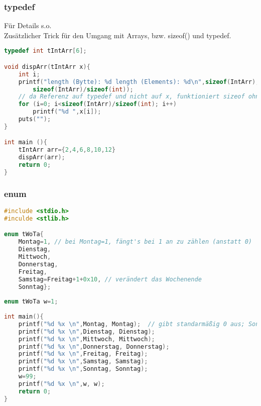 \subsubsection{typedef}
Für Details s.o. \\
Zusätzlicher Trick für den Umgang mit Arrays, bzw. sizeof() und typedef.
\begin{lstlisting}[language=C]
typedef int tIntArr[6];

void dispArr(tIntArr x){
	int i;
	printf("length (Bytte): %d length (Elements): %d\n",sizeof(IntArr),
		sizeof(IntArr)/sizeof(int));
	// da Referenz auf typedef und nicht auf x, funktioniert sizeof ohne Probleme
	for (i=0; i<sizeof(IntArr)/sizeof(int); i++)	
		printf("%d ",x[i]);
	puts("");
}

int main (){
	tIntArr arr={2,4,6,8,10,12}
	dispArr(arr);
	return 0;
}
\end{lstlisting}

\subsubsection{enum}

\begin{lstlisting}[language=C]
#include <stdio.h>
#inculde <stlib.h>

enum tWoTa{
	Montag=1, // bei Montag=1, fängt's bei 1 an zu zählen (anstatt 0)
	Dienstag, 
	Mittwoch, 
	Donnerstag,
	Freitag,
	Samstag=Freitag+1+0x10,	// verändert das Wochenende
	Sonntag};
	
enum tWoTa w=1;
	
int main(){
	printf("%d %x \n",Montag, Montag);	// gibt standarmäßig 0 aus; Sonntag wäre 6 usw.
	printf("%d %x \n",Dienstag, Dienstag);
	printf("%d %x \n",Mittwoch, Mittwoch);
	printf("%d %x \n",Donnerstag, Donnerstag);
	printf("%d %x \n",Freitag, Freitag);
	printf("%d %x \n",Samstag, Samstag);
	printf("%d %x \n",Sonntag, Sonntag);
	w=99;	
	printf("%d %x \n",w, w);
	return 0;
}
\end{lstlisting}
